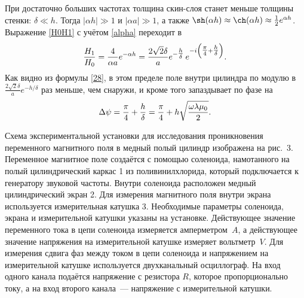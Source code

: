 При достаточно больших частотах толщина скин-слоя станет меньше толщины стенки:
$\delta \ll h$. Тогда $|\alpha h| \gg 1$ и $|\alpha a| \gg 1$, а
также $\sh(\alpha h)\approx\ch(\alpha h)\approx\frac12e^{\alpha h}$. 
Выражение \eqref{H0H1} с учётом \eqref{alpha} переходит в
\begin{equation} \eqmark{28}
\frac{H_1}{H_0}= \frac{4}{\alpha a} e^{-\alpha h} 
= \frac{2\sqrt{2}\delta}{a}e^{-\tfrac{h}{\delta}}\,e^{-i\left(\tfrac{\pi}{4}+\tfrac{h}{\delta}\right)}.
\end{equation}
Как видно из формулы \eqref{28}, в этом пределе поле внутри цилиндра по модулю в
$\frac{2\sqrt{2}\delta}{a}e^{-h/\delta}$ раз меньше, чем снаружи, и 
кроме того запаздывает по фазе на
\begin{equation} \eqmark{29}
\Delta\psi=\frac{\pi}{4}+\frac{h}{\delta}=
\frac{\pi}{4}+h\sqrt{\frac{\omega\lambda\mu_0}{2}}.
\end{equation}





\experiment
Схема экспериментальной установки для исследования проникновения переменного магнитного поля в медный полый цилиндр
изображена на рис.~3. Переменное магнитное поле создаётся с помощью соленоида, намотанного на полый цилиндрический каркас 1
из поливинилхлорида, который подключается к генератору звуковой частоты. Внутри соленоида расположен медный цилиндрический
экран 2. Для измерения магнитного поля внутри экрана используется измерительная катушка 3. Необходимые параметры
соленоида, экрана и измерительной катушки указаны на установке. Действующее значение переменного тока в цепи соленоида
измеряется амперметром~$A$, а действующее значение напряжения 
на измерительной катушке измеряет вольтметр~$V$. Для измерения сдвига фаз между током в цепи соленоида и напряжением на измерительной катушке
используется двухканальный осциллограф. На вход одного канала подаётся напряжение с резистора $R$, которое
пропорционально току, а на вход второго канала~--- напряжение с измерительной катушки.

